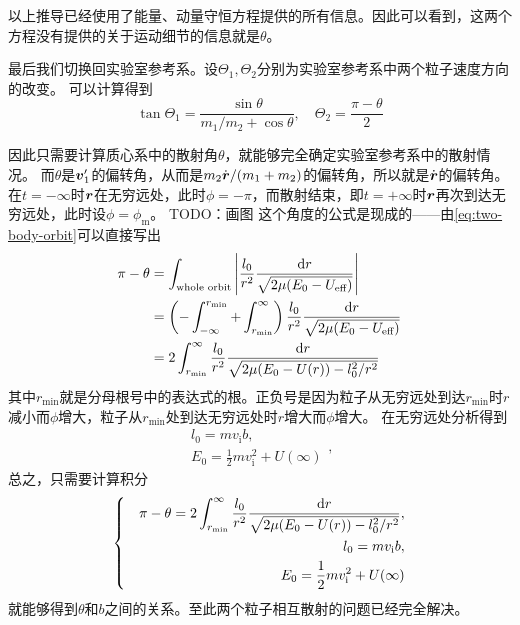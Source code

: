 \documentclass[UTF8, a4paper]{ctexart}
\renewcommand*{\dd}{\mathop{}\!\mathrm{d}}
\newenvironment{bigcase}{\left\{\quad\begin{aligned}}{\end{aligned}\right.}
\begin{document}
以上推导已经使用了能量、动量守恒方程提供的所有信息。因此可以看到，这两个方程没有提供的关于运动细节的信息就是$\theta$。

最后我们切换回实验室参考系。设$\Theta_1, \Theta_2$分别为实验室参考系中两个粒子速度方向的改变。
可以计算得到
\begin{equation}
    \tan \Theta_1 = \frac{\sin \theta}{m_1 / m_2 + \cos \theta}, \quad \Theta_2 = \frac{\pi - \theta}{2}
\end{equation}

因此只需要计算质心系中的散射角$\theta$，就能够完全确定实验室参考系中的散射情况。
而$\theta$是$\vb*{v}_{1}'$的偏转角，从而是$m_2 \dot{\vb*{r}} / (m_1 + m_2)$的偏转角，所以就是$\dot{\vb*{r}}$的偏转角。
在$t=-\infty$时$\vb*{r}$在无穷远处，此时$\phi=-\pi$，而散射结束，即$t=+\infty$时$\vb*{r}$再次到达无穷远处，此时设$\phi = \phi_\text{m}$。
TODO：画图
这个角度的公式是现成的——由\eqref{eq:two-body-orbit}可以直接写出
\[
    \begin{aligned}
        \pi - \theta &= \int_\text{whole orbit} \abs{ \frac{l_0}{r^2} \frac{\dd r}{\sqrt{2\mu (E_0 - U_\text{eff})}}} \\
        &= \left( - \int_{-\infty}^{r_\text{min}} + \int_{r_\text{min}}^\infty \right) \frac{l_0}{r^2} \frac{\dd r}{\sqrt{2\mu (E_0 - U_\text{eff})}} \\
        &= 2 \int_{r_\text{min}}^\infty \frac{l_0}{r^2} \frac{\dd r}{\sqrt{2\mu(E_0 - U(r)) - l_0^2 / r^2}}
    \end{aligned}
\]
其中$r_\text{min}$就是分母根号中的表达式的根。正负号是因为粒子从无穷远处到达$r_\text{min}$时$r$减小而$\phi$增大，粒子从$r_\text{min}$处到达无穷远处时$r$增大而$\phi$增大。
在无穷远处分析得到
\[
    \begin{split}
        l_0 = m v_\text{i} b, \\
        E_0 = \frac{1}{2} m v_\text{i}^2 + U(\infty)
    \end{split},
\]
总之，只需要计算积分
\begin{equation}
    \begin{bigcase}
        \pi - \theta = 2 \int_{r_\text{min}}^\infty \frac{l_0}{r^2} \frac{\dd r}{\sqrt{2\mu(E_0 - U(r)) - l_0^2 / r^2}}, \\
        l_0 = m v_\text{i} b, \\
        E_0 = \frac{1}{2} m v_\text{i}^2 + U(\infty)
    \end{bigcase}
    \label{eq:scattering-angle}
\end{equation}
就能够得到$\theta$和$b$之间的关系。至此两个粒子相互散射的问题已经完全解决。
\end{document}
